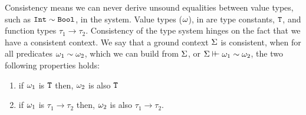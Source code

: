 \documentclass[format=acmsmall,manuscript,review,screen,nonacm,margin=1in,11pt]{acmart}
\begin{document}
Consistency means we can never derive unsound equalities between value types,
such as $\texttt{Int}\mathrel{\sim}\texttt{Bool}$, in the system. Value types ($\omega$), in \CLTF are
type constants, $\texttt{T}$, and function types $\tau_1\to\tau_2$.
Consistency of the type system hinges on the fact that we have a consistent context.
We say that a ground context $\Sigma$ is consistent, when for all predicates $\omega_1 \mathrel{\sim} \omega_2$,
which we can build from $\Sigma$, or $\Sigma\vdash\hspace{-0.7ex}\vdash\omega_1\mathrel{\sim}\omega_2$, the two following properties holds:
\begin{enumerate}
\item if $\omega_1$ is $\texttt{T}$ then, $\omega_2$ is also $\texttt{T}$
\item if $\omega_1$ is $\tau_1\to\tau_2$ then, $\omega_2$ is also $\tau_1\to\tau_2$.
\end{enumerate}
\end{document}

